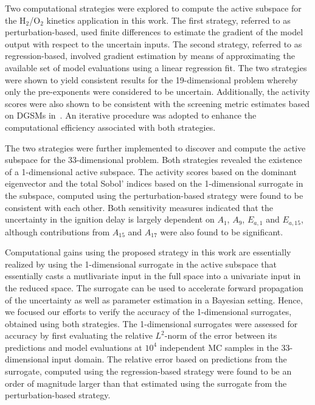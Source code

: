 Two computational strategies were explored to compute the active subspace for
the H$_2$/O$_2$ kinetics application in this work. The first strategy, referred
to as perturbation-based, used finite differences to estimate the gradient of the
model output with respect to the uncertain inputs. The second strategy, referred
to as regression-based, involved gradient estimation by means of approximating
the available set of model evaluations using a linear regression fit.  The two
strategies were shown to yield consistent results for the 19-dimensional
problem whereby only the pre-exponents were considered to be uncertain.
Additionally, the activity scores were also shown to be consistent with the
screening metric estimates based on DGSMs in~\cite{Vohra:2018}. An
iterative procedure was adopted to enhance the computational efficiency
associated with both strategies. 

The two strategies were further implemented to discover and compute the active
subspace for the 33-dimensional problem. 
Both strategies revealed the existence
of a 1-dimensional active subspace. The activity scores based on the dominant
eigenvector and the total Sobol' indices based on the 1-dimensional surrogate in
the subspace, computed using the perturbation-based strategy were found to be
consistent with each other. Both sensitivity measures indicated that the
uncertainty in the ignition delay is largely dependent on $A_1$, $A_9$,
$E_{a,1}$ and $E_{a,15}$, although contributions from $A_{15}$ and $A_{17}$
were also found to be significant. 

Computational gains using the proposed strategy in this work are essentially
realized by using the 1-dimensional surrogate in the active subspace that
essentially casts a mutlivariate input in the full space into a univariate
input in the reduced space. The surrogate can be used to accelerate forward
propagation of the uncertainty as well as parameter estimation in a Bayesian
setting. Hence, we focused our efforts to verify the accuracy of the
1-dimensional surrogates, obtained using both strategies.  The 1-dimensional
surrogates were assessed for accuracy by first evaluating the relative $L^2$-norm
of the error between its predictions and model evaluations at $10^4$
independent MC samples in the 33-dimensional input domain. The relative error
based on predictions from the surrogate, computed using the regression-based
strategy were found to be an order of magnitude larger than that estimated
using the surrogate from the perturbation-based strategy.

